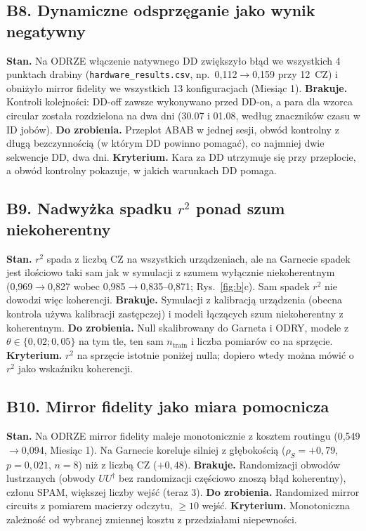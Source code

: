 \documentclass[11pt,a4paper]{article}
\begin{document}
\subsection*{B8. Dynamiczne odsprzęganie jako wynik negatywny}
\textbf{Stan.} Na ODRZE włączenie natywnego DD zwiększyło błąd we wszystkich 4 punktach
drabiny (\texttt{hardware\_results.csv}, np.\ 0{,}112$\to$0{,}159 przy 12~CZ) i obniżyło
mirror fidelity we wszystkich 13 konfiguracjach (Miesiąc 1). \textbf{Brakuje.} Kontroli
kolejności: DD-off zawsze wykonywano przed DD-on, a para dla wzorca circular została
rozdzielona na dwa dni (30.07 i 01.08, według znaczników czasu w ID jobów).
\textbf{Do zrobienia.} Przeplot ABAB w jednej sesji, obwód kontrolny z długą bezczynnością
(w którym DD powinno pomagać), co najmniej dwie sekwencje DD, dwa dni.
\textbf{Kryterium.} Kara za DD utrzymuje się przy przeplocie, a obwód kontrolny pokazuje,
w jakich warunkach DD pomaga.

\subsection*{B9. Nadwyżka spadku $r^2$ ponad szum niekoherentny}
\textbf{Stan.} $r^2$ spada z liczbą CZ na wszystkich urządzeniach, ale na Garnecie spadek
jest ilościowo taki sam jak w symulacji z szumem wyłącznie niekoherentnym (0{,}969$\to$0{,}827
wobec 0{,}985$\to$0{,}835--0{,}871; Rys.~\ref{fig:b}c). Sam spadek $r^2$ nie dowodzi więc
koherencji. \textbf{Brakuje.} Symulacji z kalibracją urządzenia (obecna kontrola używa
kalibracji zastępczej) i modeli łączących szum niekoherentny z koherentnym.
\textbf{Do zrobienia.} Null skalibrowany do Garneta i ODRY, modele z $\theta\in\{0{,}02;0{,}05\}$
na tym tle, ten sam $n_{\text{train}}$ i liczba pomiarów co na sprzęcie.
\textbf{Kryterium.} $r^2$ na sprzęcie istotnie poniżej nulla; dopiero wtedy można mówić o
$r^2$ jako wskaźniku koherencji.

\subsection*{B10. Mirror fidelity jako miara pomocnicza}
\textbf{Stan.} Na ODRZE mirror fidelity maleje monotonicznie z kosztem routingu
(0{,}549$\to$0{,}094, Miesiąc 1). Na Garnecie koreluje silniej z głębokością
($\rho_S=+0{,}79$, $p=0{,}021$, $n=8$) niż z liczbą CZ ($+0{,}48$).
\textbf{Brakuje.} Randomizacji obwodów lustrzanych (obwody $UU^\dagger$ bez randomizacji
częściowo znoszą błąd koherentny), członu SPAM, większej liczby wejść (teraz 3).
\textbf{Do zrobienia.} Randomized mirror circuits z pomiarem macierzy odczytu, $\geq10$ wejść.
\textbf{Kryterium.} Monotoniczna zależność od wybranej zmiennej kosztu z przedziałami
niepewności.
\end{document}
